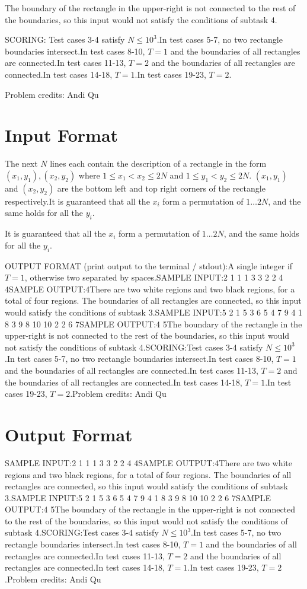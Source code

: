 \documentclass[12pt]{article}
\begin{document}
The boundary of the rectangle in the upper-right is not connected to the rest of
the boundaries, so this input would not satisfy the conditions of subtask 4.


SCORING:
Test cases 3-4 satisfy $N\le 10^3$.In test cases 5-7, no two rectangle boundaries intersect.In test cases 8-10, $T=1$ and the boundaries of all rectangles are
connected.In test cases 11-13, $T=2$ and the boundaries of all rectangles are
connected.In test cases 14-18, $T=1$.In test cases 19-23, $T=2$.


Problem credits: Andi Qu



\section*{Input Format}
The next $N$ lines each contain the description of a rectangle in the form
$(x_1,y_1), (x_2,y_2)$ where $1\le x_1<x_2\le 2N$ and $1\le y_1<y_2\le 2N$.
$(x_1, y_1)$ and $(x_2, y_2)$ are the bottom left and top right corners of the
rectangle respectively.It is guaranteed that all the $x_i$ form a permutation of $1\ldots 2N$, and the
same holds for all the $y_i$.

It is guaranteed that all the $x_i$ form a permutation of $1\ldots 2N$, and the
same holds for all the $y_i$.

OUTPUT FORMAT (print output to the terminal / stdout):A single integer if $T=1$, otherwise two separated by spaces.SAMPLE INPUT:2 1
1 1 3 3
2 2 4 4SAMPLE OUTPUT:4There are two white regions and two black regions, for a total of four regions.
The boundaries of all rectangles are connected, so this input would satisfy the
conditions of subtask 3.SAMPLE INPUT:5 2
1 5 3 6
5 4 7 9
4 1 8 3
9 8 10 10
2 2 6 7SAMPLE OUTPUT:4 5The boundary of the rectangle in the upper-right is not connected to the rest of
the boundaries, so this input would not satisfy the conditions of subtask 4.SCORING:Test cases 3-4 satisfy $N\le 10^3$.In test cases 5-7, no two rectangle boundaries intersect.In test cases 8-10, $T=1$ and the boundaries of all rectangles are
connected.In test cases 11-13, $T=2$ and the boundaries of all rectangles are
connected.In test cases 14-18, $T=1$.In test cases 19-23, $T=2$.Problem credits: Andi Qu

\section*{Output Format}
SAMPLE INPUT:2 1
1 1 3 3
2 2 4 4SAMPLE OUTPUT:4There are two white regions and two black regions, for a total of four regions.
The boundaries of all rectangles are connected, so this input would satisfy the
conditions of subtask 3.SAMPLE INPUT:5 2
1 5 3 6
5 4 7 9
4 1 8 3
9 8 10 10
2 2 6 7SAMPLE OUTPUT:4 5The boundary of the rectangle in the upper-right is not connected to the rest of
the boundaries, so this input would not satisfy the conditions of subtask 4.SCORING:Test cases 3-4 satisfy $N\le 10^3$.In test cases 5-7, no two rectangle boundaries intersect.In test cases 8-10, $T=1$ and the boundaries of all rectangles are
connected.In test cases 11-13, $T=2$ and the boundaries of all rectangles are
connected.In test cases 14-18, $T=1$.In test cases 19-23, $T=2$.Problem credits: Andi Qu
\end{document}

